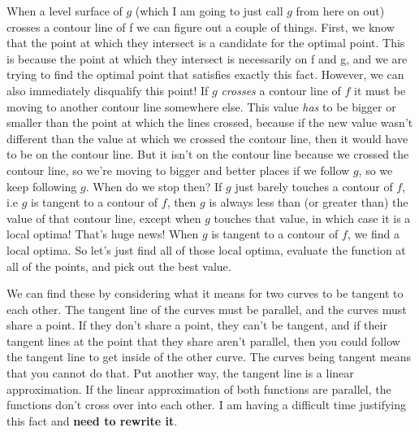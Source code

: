 \documentclass[12pt, letterpaper]{article}
\begin{document}
When a level surface of $g$ (which I am going to just call $g$ from here on out) crosses a contour line of f we can figure out a couple of things.
First, we know that the point at which they intersect is a candidate for the optimal point.
This is because the point at which they intersect is necessarily on f and g, and we are trying to find the optimal point that satisfies exactly this fact.
However, we can also immediately disqualify this point!
If $g$ \emph{crosses} a contour line of $f$ it must be moving to another contour line somewhere else.
This value \emph{has} to be bigger or smaller than the point at which the lines crossed, because if the new value wasn't different than the value at which we crossed the contour line, then it would have to be on the contour line.
But it isn't on the contour line because we crossed the contour line, so we're moving to bigger and better places if we follow $g$, so we keep following $g$.
When do we stop then? If $g$ just barely touches a contour of $f$, i.e $g$ is tangent to a contour of $f$, then $g$ is always less than (or greater than) the value of that contour line, except when $g$ touches that value, in which case it is a local optima!
That's huge news! When $g$ is tangent to a contour of $f$, we find a local optima. So let's just find all of those local optima, evaluate the function at all of the points, and pick out the best value.

We can find these by considering what it means for two curves to be tangent to each other. 
The tangent line of the curves must be parallel, and the curves must share a point.
If they don't share a point, they can't be tangent, and if their tangent lines at the point that they share aren't parallel, then you could follow the tangent line to get inside of the other curve.
The curves being tangent means that you cannot do that. 
Put another way, the tangent line is a linear approximation. 
If the linear approximation of both functions are parallel, the functions don't cross over into each other. 
I am having a difficult time justifying this fact and \textbf{need to rewrite it}.
\end{document}
